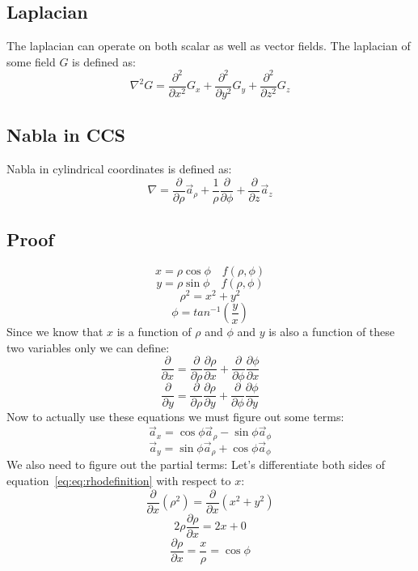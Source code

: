         \subsection{Laplacian}
            The laplacian can operate on both scalar as well as vector fields. The laplacian of some field $G$ is defined as:
            $$\nabla^2G = \frac{\partial^2}{\partial x^2}G_x + \frac{\partial^2}{\partial y^2}G_y + \frac{\partial^2}{\partial z^2}G_z$$
        \subsection{Nabla in CCS}
            Nabla in cylindrical coordinates is defined as:
            $$\nabla = \frac{\partial}{\partial \rho}\vec{a}_\rho + \frac{1}{\rho}\frac{\partial}{\partial \phi} + \frac{\partial}{\partial z}\vec{a}_z$$
            \subsection{Proof}
                $$x = \rho\cos\phi \quad f(\rho, \phi)$$
                $$y = \rho\sin\phi \quad f(\rho, \phi)$$
                \begin{equation}\label{eq:rhodefinition}
                    \rho^2 = x^2 + y^2
                \end{equation}
                $$\phi = tan^{-1}\left(\frac{y}{x}\right)$$
                Since we know that $x$ is a function of $\rho$ and $\phi$ and $y$ is also a function of these two variables only we can define:
                $$\frac{\partial}{\partial x} = \frac{\partial}{\partial \rho}\frac{\partial \rho}{\partial x} + \frac{\partial}{\partial \phi }\frac{\partial \phi}{\partial x}$$
                $$\frac{\partial}{\partial y} = \frac{\partial}{\partial \rho}\frac{\partial \rho}{\partial y} + \frac{\partial}{\partial \phi }\frac{\partial \phi}{\partial y}$$
                Now to actually use these equations we must figure out some terms:
                $$\vec{a}_x = \cos\phi\vec{a}_\rho - \sin\phi\vec{a}_\phi$$
                $$\vec{a}_y = \sin\phi\vec{a}_\rho + \cos\phi\vec{a}_\phi$$
                We also need to figure out the partial terms:
                Let's differentiate both sides of equation~\ref{eq:eq:rhodefinition} with respect to $x$:
                $$\frac{\partial}{\partial x}\left(\rho^2\right)=\frac{\partial}{\partial x}\left(x^2 + y^2\right)$$
                $$2\rho\frac{\partial \rho}{\partial x} = 2x + 0$$
                $$\frac{\partial \rho}{\partial x} = \frac{x}{\rho} = \cos\phi$$
